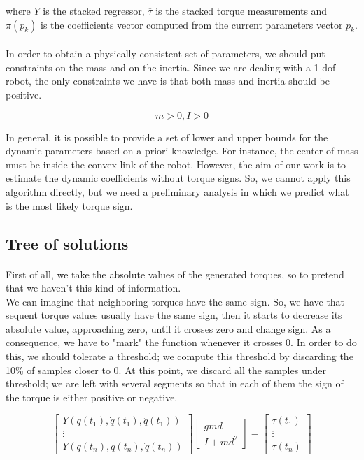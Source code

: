 \documentclass{article}
\begin{document}
\noindent where $\overline{Y}$ is the stacked regressor, $\overline{\tau}$ is the stacked  torque measurements and $\pi(p_k)$ is the coefficients vector computed from the current parameters vector $p_k$.

\paragraph{}In order to obtain a physically consistent set of parameters, we should put constraints on the mass and on the inertia. Since we are dealing with a 1 dof robot, the only constraints we have is that both mass and inertia should be positive.

\[m > 0, I > 0\]

In general, it is possible to provide a set of lower and upper bounds for the dynamic parameters based on a priori knowledge. For instance, the center of mass must be inside the convex link of the robot. However, the aim of our work is to estimate the dynamic coefficients without torque signs. So, we cannot apply this algorithm directly, but we need a preliminary analysis in which we predict what is the most likely torque sign.

\subsection{Tree of solutions}
\paragraph{}First of all, we take the absolute values of the generated torques, so to pretend that we haven't this kind of information.\\
We can imagine that neighboring torques have the same sign. So, we have that sequent torque values usually have the same sign, then it starts to decrease its absolute value, approaching zero, until it crosses zero and change sign. As a consequence, we have to "mark" the function whenever it crosses 0. In order to do this, we should tolerate a threshold; we compute this threshold by discarding the 10\% of samples closer to 0. At this point, we discard all the samples under threshold; we are left with several segments so that in each of them the sign of the torque is either positive or negative.

\vspace{1em}
\[\begin{bmatrix}
Y(q(t_1),\dot{q}(t_1),\ddot{q}(t_1))\\
\vdots \\
Y(q(t_n),\dot{q}(t_n),\ddot{q}(t_n))
\end{bmatrix} \begin{bmatrix}
gmd \\ I +md^2
\end{bmatrix} = \begin{bmatrix}
\tau(t_1)\\
\vdots \\
\tau(t_n)
\end{bmatrix} \]
\vspace{1em}
\end{document}
